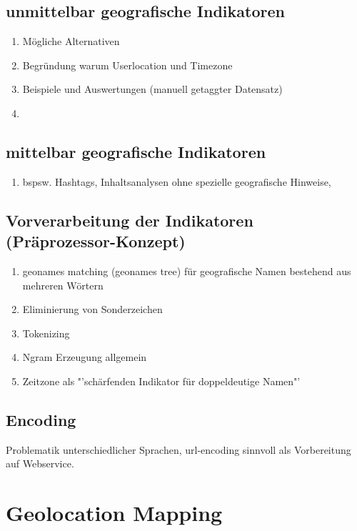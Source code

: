 	\subsection{unmittelbar geografische Indikatoren}
		\begin{enumerate}
			\item Mögliche Alternativen
			\item Begründung warum Userlocation und Timezone
			\item Beispiele und Auswertungen (manuell getaggter Datensatz)
			\item \cite{Hecht2011} 
		\end{enumerate}

	\subsection{mittelbar geografische Indikatoren}
		\begin{enumerate}
			\item bspsw. Hashtags, Inhaltsanalysen ohne spezielle geografische Hinweise, 
		\end{enumerate}

	
	\subsection{Vorverarbeitung der Indikatoren (Präprozessor-Konzept)}
		\begin{enumerate}
			\item geonames matching (geonames tree) für geografische Namen bestehend aus mehreren Wörtern
			\item Eliminierung von Sonderzeichen
			\item Tokenizing
			\item Ngram Erzeugung allgemein
			\item {} Zeitzone als "'schärfenden Indikator für doppeldeutige Namen"'
		\end{enumerate}

	\subsection{Encoding}
		Problematik unterschiedlicher Sprachen, 
		url-encoding sinnvoll als Vorbereitung auf Webservice. 

\section{Geolocation Mapping}

